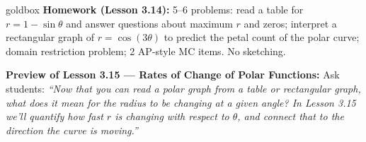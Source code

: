\documentclass[10pt]{article}
\begin{document}
\vspace{0.08in}

\begin{skillbox}{goldbox}
\textbf{Homework (Lesson 3.14):} 5--6 problems: read a table for $r = 1 - \sin\theta$
and answer questions about maximum $r$ and zeros; interpret a rectangular graph of
$r = \cos(3\theta)$ to predict the petal count of the polar curve; domain restriction
problem; 2 AP-style MC items. No sketching.

\textbf{Preview of Lesson 3.15 --- Rates of Change of Polar Functions:}
Ask students: \textit{``Now that you can read a polar graph from a table or rectangular
graph, what does it mean for the radius to be \emph{changing} at a given angle?
In Lesson 3.15 we'll quantify how fast $r$ is changing with respect to $\theta$,
and connect that to the direction the curve is moving.''}
\end{skillbox}
\end{document}
